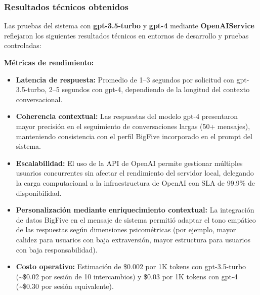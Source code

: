 \documentclass[12pt,a4paper]{report}
\numberwithin{figure}{section}
\begin{document}
\vspace{1em}
\subsubsection{Resultados técnicos obtenidos}
\label{subsubsec:resultados_openai}

Las pruebas del sistema con \textbf{gpt-3.5-turbo} y \textbf{gpt-4} mediante \textbf{OpenAIService} reflejaron los siguientes resultados técnicos en entornos de desarrollo y pruebas controladas:

\textbf{Métricas de rendimiento:}
\begin{itemize}
  \item \textbf{Latencia de respuesta:} Promedio de 1–3 segundos por solicitud con gpt-3.5-turbo, 2–5 segundos con gpt-4, dependiendo de la longitud del contexto conversacional.
  
  \item \textbf{Coherencia contextual:} Las respuestas del modelo gpt-4 presentaron mayor precisión en el seguimiento de conversaciones largas (50+ mensajes), manteniendo consistencia con el perfil BigFive incorporado en el prompt del sistema.
  
  \item \textbf{Escalabilidad:} El uso de la API de OpenAI permite gestionar múltiples usuarios concurrentes sin afectar el rendimiento del servidor local, delegando la carga computacional a la infraestructura de OpenAI con SLA de 99.9\% de disponibilidad.
  
  \item \textbf{Personalización mediante enriquecimiento contextual:} La integración de datos BigFive en el mensaje de sistema permitió adaptar el tono empático de las respuestas según dimensiones psicométricas (por ejemplo, mayor calidez para usuarios con baja extraversión, mayor estructura para usuarios con baja responsabilidad).
  
  \item \textbf{Costo operativo:} Estimación de \$0.002 por 1K tokens con gpt-3.5-turbo (\textasciitilde\$0.02 por sesión de 10 intercambios) y \$0.03 por 1K tokens con gpt-4 (\textasciitilde\$0.30 por sesión equivalente).
\end{itemize}






\end{document}
